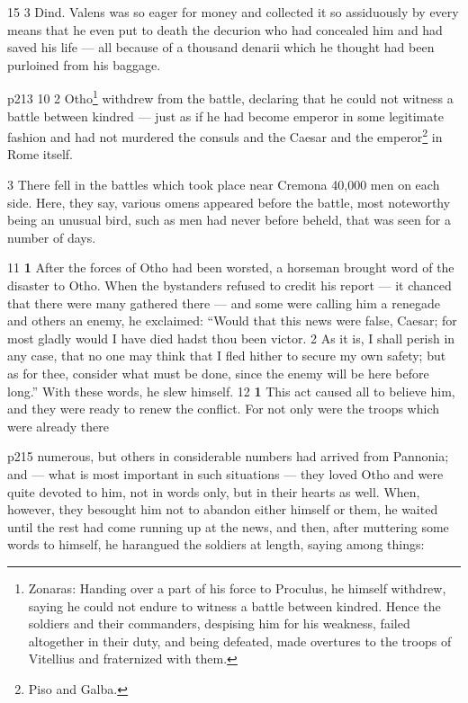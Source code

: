 15
3 Dind.
Valens was so eager for money and collected it so assiduously by every means that he even put to death the decurion who had concealed him and had saved his life \texthebrew{—} all because of a thousand denarii which he thought had been purloined from his baggage.

p213
10
2
Otho\texthebrew{⁠}\footnote{Zonaras: Handing over a part of his force to Proculus, he himself withdrew, saying he could not endure to witness a battle between kindred. Hence the soldiers and their commanders, despising him for his weakness, failed altogether in their duty, and being defeated, made overtures to the troops of Vitellius and fraternized with them.

} withdrew from the battle, declaring that he could not witness a battle between kindred \texthebrew{—} just as if he had become emperor in some legitimate fashion and had not murdered the consuls and the Caesar and the emperor\texthebrew{⁠}\footnote{Piso and Galba.

} in Rome itself.

3
There fell in the battles which took place near Cremona 40,000 men on each side. Here, they say, various omens appeared before the battle, most noteworthy being an unusual bird, such as men had never before beheld, that was seen for a number of days.

11
\textbf{1} After the forces of Otho had been worsted, a horseman brought word of the disaster to Otho. When the bystanders refused to credit his report \texthebrew{—} it chanced that there were many gathered there \texthebrew{—} and some were calling him a renegade and others an enemy, he exclaimed: ``Would that this news were false, Caesar; for most gladly would I have died hadst thou been victor. 2 As it is, I shall perish in any case, that no one may think that I fled hither to secure my own safety; but as for thee, consider what must be done, since the enemy will be here before long.'' With these words, he slew himself.
12
\textbf{1} This act caused all to believe him, and they were ready to renew the conflict. For not only were the troops which were already there

p215 numerous, but others in considerable numbers had arrived from Pannonia; and \texthebrew{—} what is most important in such situations \texthebrew{—} they loved Otho and were quite devoted to him, not in words only, but in their hearts as well. When, however, they besought him not to abandon either himself or them, he waited until the rest had come running up at the news, and then, after muttering some words to himself, he harangued the soldiers at length, saying among things:

